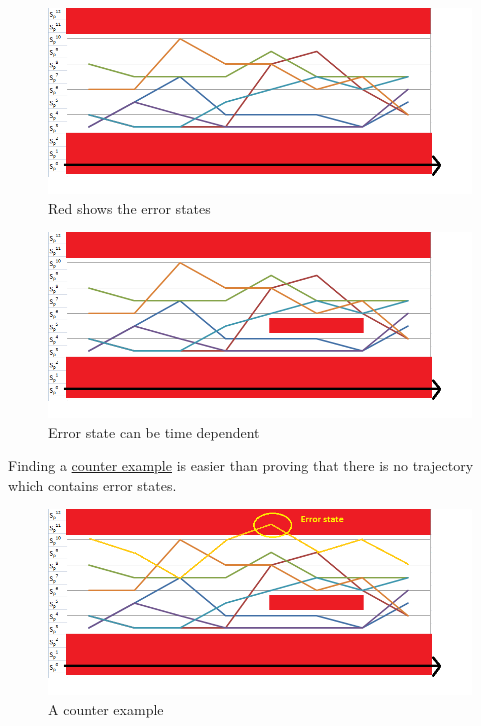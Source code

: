 \begin{figure} [!ht]
	\centering
	\includegraphics[width=150mm, keepaspectratio]{figures/trajectory2.png}
	\caption{\label{fig:trajectory2}Red shows the error states}
\end{figure}

\begin{figure} [!ht]
	\centering
	\includegraphics[width=150mm, keepaspectratio]{figures/trajectory3.png}
	\caption{\label{fig:trajectory3}Error state can be time dependent}
\end{figure}

Finding a \hyperref[fig:trajectory4]{counter example} is easier than proving that there is no trajectory which contains error states. 

\begin{figure} [!ht]
	\centering
	\includegraphics[width=150mm, keepaspectratio]{figures/trajectory4.png}
	\caption{\label{fig:trajectory4}A counter example}
\end{figure}


